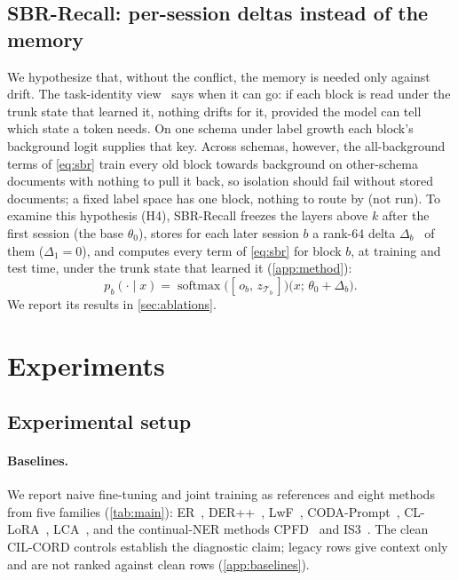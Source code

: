 \documentclass[10pt,twocolumn,letterpaper]{article}
\begin{document}
\subsection{SBR-Recall: per-session deltas instead of the memory}
\label{sec:recall}
We hypothesize that, without the conflict, the memory is needed only against drift. The task-identity view~\citep{kim2022theoretical} says when it can go: if each block is read under the trunk state that learned it, nothing drifts for it, provided the model can tell which state a token needs. On one schema under label growth each block's background logit supplies that key. Across schemas, however, the all-background terms of \cref{eq:sbr} train every old block towards background on other-schema documents with nothing to pull it back, so isolation should fail without stored documents; a fixed label space has one block, nothing to route by (not run). To examine this hypothesis (H4), SBR-Recall freezes the layers above $k$ after the first session (the base $\theta_0$), stores for each later session $b$ a rank-$64$ delta $\Delta_b$~\citep{hu2022lora} of them ($\Delta_1{=}0$), and computes every term of \cref{eq:sbr} for block $b$, at training and test time, under the trunk state that learned it (\cref{app:method}):
\begin{equation}
p_b(\cdot\mid x)=\operatorname{softmax}\big([\,o_b,\,z_{\mathcal{T}_b}\,]\big)\big(x;\,\theta_0+\Delta_b\big).
\label{eq:recall}
\end{equation}
We report its results in \cref{sec:ablations}.

\section{Experiments}
\label{sec:experiments}
\subsection{Experimental setup}
\paragraph{Baselines.} We report naive fine-tuning and joint training as references and eight methods from five families (\cref{tab:main}): ER~\citep{rolnick2019er}, DER++~\citep{buzzega2020der}, LwF~\citep{li2017lwf}, CODA-Prompt~\citep{smith2023coda}, CL-LoRA~\citep{he2025cllora}, LCA~\citep{lca2026}, and the continual-NER methods CPFD~\citep{zhang2023cpfd} and IS3~\citep{qiu2024is3}. The clean CIL-CORD controls establish the diagnostic claim; legacy rows give context only and are not ranked against clean rows (\cref{app:baselines}).
\end{document}
